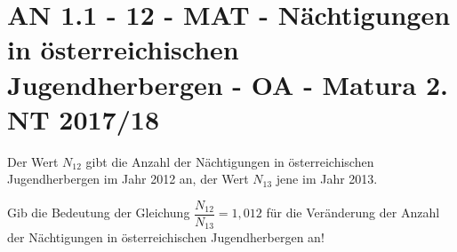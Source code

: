 \section{AN 1.1 - 12 - MAT - Nächtigungen in österreichischen Jugendherbergen - OA - Matura 2. NT 2017/18}

\begin{beispiel}[AN 1.1]{1}
Der Wert $N_{12}$ gibt die Anzahl der Nächtigungen in österreichischen Jugendherbergen im Jahr 2012 an, der Wert $N_{13}$ jene im Jahr 2013.\leer

Gib die Bedeutung der Gleichung $\dfrac{N_{12}}{N_{13}}=1,012$ für die Veränderung der Anzahl der Nächtigungen in österreichischen Jugendherbergen an!

\end{beispiel}